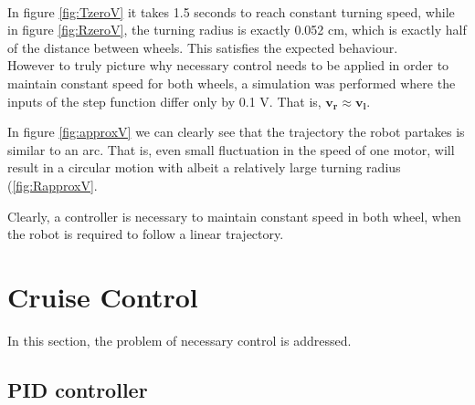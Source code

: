     ~ %
    ~ %

In figure \ref{fig:TzeroV} it takes 1.5 seconds to reach constant turning speed, while in figure \ref{fig:RzeroV}, the turning radius is exactly 0.052 cm, which is exactly half of the distance between wheels. This satisfies the expected behaviour. \\


However to truly picture why necessary control needs to be applied in order to maintain constant speed for both wheels, a simulation was performed where the inputs of the step function differ only by 0.1 V. That is, $\boldsymbol{v_r \approx v_l}$. 

In figure \ref{fig:approxV} we can clearly see that the trajectory the robot partakes is similar to an arc. That is, even small fluctuation in the speed of one motor, will result in a circular motion with albeit a relatively large turning radius (\ref{fig:RapproxV}. 

\newpage



Clearly, a controller is necessary to maintain constant speed in both wheel, when the robot is required to follow a linear trajectory.

\section{Cruise Control}

In this section, the problem of necessary control is addressed. 

\subsection{PID controller}

